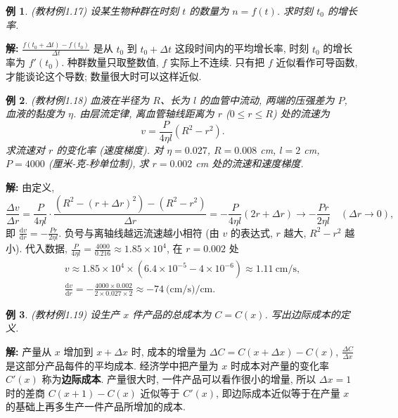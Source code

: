 \documentclass[UTF8,openany]{ctexbook}
\theoremstyle{chinesetextbook}
\newtheorem{example}{例}[section]
\newenvironment{cnsolution}{\par\indent\textbf{解:} \ignorespaces}{\par}
\newcommand{\dd}{\mathrm d}
\begin{document}
\begin{example}\label{ex:c2-1-17}
\textnormal{(教材例1.17)} 设某生物种群在时刻 $t$ 的数量为 $n=f(t)$. 求时刻 $t_0$ 的增长率.
\end{example}
\begin{cnsolution}
$\displaystyle\frac{f(t_0+\Delta t)-f(t_0)}{\Delta t}$ 是从 $t_0$ 到 $t_0+\Delta t$ 这段时间内的平均增长率, 时刻 $t_0$ 的增长率为 $f'(t_0)$. 种群数量只取整数值, $f$ 实际上不连续. 只有把 $f$ 近似看作可导函数, 才能谈论这个导数; 数量很大时可以这样近似.
\end{cnsolution}
\begin{example}\label{ex:c2-1-18}
\textnormal{(教材例1.18)} 血液在半径为 $R$、长为 $l$ 的血管中流动, 两端的压强差为 $P$, 血液的黏度为 $\eta$. 由层流定律, 离血管轴线距离为 $r$ ($0\le r\le R$) 处的流速为
\[
v=\frac P{4\eta l}\left(R^2-r^2\right).
\]
求流速对 $r$ 的变化率 (速度梯度). 对 $\eta=0.027$, $R=0.008$ cm, $l=2$ cm, $P=4000$ (厘米-克-秒单位制), 求 $r=0.002$ cm 处的流速和速度梯度.
\end{example}
\begin{cnsolution}
由定义,
\[
\frac{\Delta v}{\Delta r}=\frac P{4\eta l}\cdot\frac{\left(R^2-(r+\Delta r)^2\right)-\left(R^2-r^2\right)}{\Delta r}=-\frac P{4\eta l}(2r+\Delta r)\to-\frac{Pr}{2\eta l}\quad(\Delta r\to0),
\]
即 $\displaystyle\frac{\dd v}{\dd r}=-\frac{Pr}{2\eta l}$. 负号与离轴线越远流速越小相符 (由 $v$ 的表达式, $r$ 越大, $R^2-r^2$ 越小). 代入数据, $\displaystyle\frac P{4\eta l}=\frac{4000}{0.216}\approx1.85\times10^4$, 在 $r=0.002$ 处
\[
\begin{gathered}
v\approx1.85\times10^4\times\left(6.4\times10^{-5}-4\times10^{-6}\right)\approx1.11\ \text{cm/s},\\
\frac{\dd v}{\dd r}=-\frac{4000\times0.002}{2\times0.027\times2}\approx-74\ \text{(cm/s)/cm}.
\end{gathered}
\]
\end{cnsolution}
\begin{example}\label{ex:c2-1-19}
\textnormal{(教材例1.19)} 设生产 $x$ 件产品的总成本为 $C=C(x)$. 写出边际成本的定义.
\end{example}
\begin{cnsolution}
产量从 $x$ 增加到 $x+\Delta x$ 时, 成本的增量为 $\Delta C=C(x+\Delta x)-C(x)$, $\displaystyle\frac{\Delta C}{\Delta x}$ 是这部分产品每件的平均成本. 经济学中把产量为 $x$ 时成本对产量的变化率 $C'(x)$ 称为\textbf{边际成本}. 产量很大时, 一件产品可以看作很小的增量, 所以 $\Delta x=1$ 时的差商 $C(x+1)-C(x)$ 近似等于 $C'(x)$, 即边际成本近似等于在产量 $x$ 的基础上再多生产一件产品所增加的成本.
\end{cnsolution}
\end{document}
